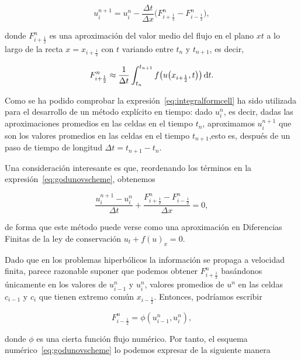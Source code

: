 \begin{equation}\label{eq:godunovscheme}
  u^{n+1}_{i}=
  u^{n}_{i}-
  \frac{\Delta t}{\Delta x}
  \big(
  F^{n}_{i+\frac{1}{2}}-
  F^{n}_{i-\frac{1}{2}}
  \big),
\end{equation}

donde $F^{n}_{i+\frac{1}{2}}$ es una aproximación del valor medio del
flujo en el plano $xt$ a lo largo de la recta $x=x_{i+\frac{1}{2}}$
con $t$ variando entre $t_{n}$ y $t_{n+1}$, es decir,

\begin{equation}\label{eq:numericalflux}
  F^{n}_{i+\frac{1}{2}}\approx
  \frac{1}{\Delta t}
  \int_{t_{n}}^{t_{n+1}}
  f
  \big(
  u
  \big(x_{i+\frac{1}{2}},t\big)
  \big)
  \dl t.
\end{equation}

Como se ha podido comprobar la expresión~\eqref{eq:integralformcell}
ha sido utilizada para el desarrollo de un método explícito en
tiempo: dado $u^{n}_{i}$, es decir, dadas las aproximaciones
promedios en las celdas en el tiempo $t_{n}$, aproximamos
$u^{n+1}_{i}$ que son los valores promedios en las celdas en el
tiempo $t_{n+1}$,esto es, después de un paso de tiempo de longitud
$\Delta t=t_{n+1}-t_{n}$.

Una consideración interesante es que, reordenando los términos en la
expresión~\eqref{eq:godunovscheme}, obtenemos

\begin{equation*}
  \frac{u^{n+1}_{i}-u^{n}_{i}}{\Delta t}+
  \frac{F^{n}_{i+\frac{1}{2}}-F^{n}_{i-\frac{1}{2}}}{\Delta x}=
  0,
\end{equation*}

de forma que este método puede verse como una aproximación en
Diferencias Finitas de la ley de conservación
$u_{t}+f\left(u\right)_{x}=0$.

Dado que en los problemas hiperbólicos la información se propaga a
velocidad finita, parece razonable suponer que podemos obtener
$F^{n}_{i+\frac{1}{2}}$ basándonos únicamente en los valores de
$u^{n}_{i-1}$ y $u^{n}_{i}$, valores promedios de $u^{n}$ en las
celdas $c_{i-1}$ y $c_{i}$ que tienen extremo común
$x_{i-\frac{1}{2}}$.
Entonces, podríamos escribir

\begin{equation*}
  F^{n}_{i-\frac{1}{2}}=
  \phi
  \left(
  u^{n}_{i-1},
  u^{n}_{i}
  \right),
\end{equation*}

donde $\phi$ es una cierta función flujo numérico.
Por tanto, el esquema numérico~\eqref{eq:godunovscheme} lo podemos
expresar de la siguiente manera

